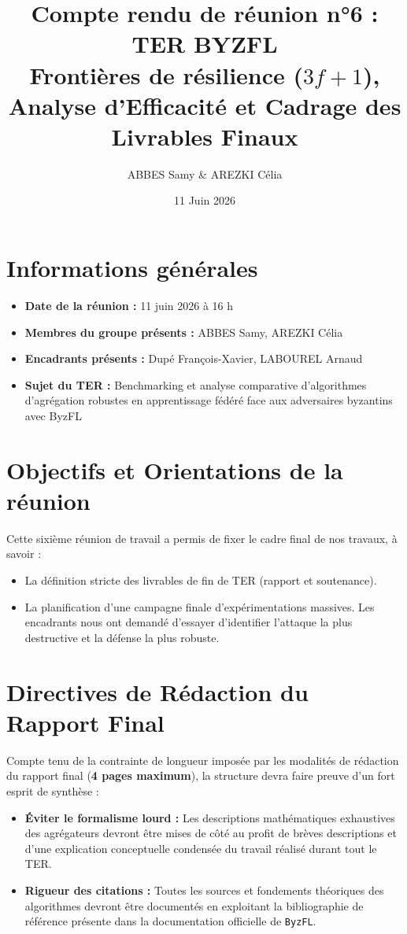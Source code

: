 \documentclass[11pt, a4paper]{article}
\title{\textbf{Compte rendu de réunion n°6 : TER BYZFL} \\ \large Frontières de résilience ($3f+1$), Analyse d'Efficacité et Cadrage des Livrables Finaux}
\author{ABBES Samy \& AREZKI Célia}
\date{11 Juin 2026}
\begin{document}
\maketitle

\section*{Informations générales}
\begin{itemize}
    \item \textbf{Date de la réunion :} 11 juin 2026 à 16 h
    \item \textbf{Membres du groupe présents :} ABBES Samy, AREZKI Célia
    \item \textbf{Encadrants présents :} Dupé François-Xavier, LABOUREL Arnaud
    \item \textbf{Sujet du TER :} Benchmarking et analyse comparative d'algorithmes d'agrégation robustes en apprentissage fédéré face aux adversaires byzantins avec ByzFL
\end{itemize}

\section{Objectifs et Orientations de la réunion}
Cette sixième réunion de travail a permis de fixer le cadre final de nos travaux, à savoir : 
\begin{itemize}
    \item La définition stricte des livrables de fin de TER (rapport et soutenance).
    \item La planification d'une campagne finale d'expérimentations massives. Les encadrants nous ont demandé d'essayer d'identifier l'attaque la plus destructive et la défense la plus robuste.
\end{itemize}

\section{Directives de Rédaction du Rapport Final}
Compte tenu de la contrainte de longueur imposée par les modalités de rédaction du rapport final (\textbf{4 pages maximum}), la structure devra faire preuve d'un fort esprit de synthèse :
\begin{itemize}
    \item \textbf{Éviter le formalisme lourd :} Les descriptions mathématiques exhaustives des agrégateurs devront être mises de côté au profit de brèves descriptions et d'une explication conceptuelle condensée du travail réalisé durant tout le TER.
    \item \textbf{Rigueur des citations :} Toutes les sources et fondements théoriques des algorithmes devront être documentés en exploitant la bibliographie de référence présente dans la documentation officielle de \texttt{ByzFL}.
\end{itemize}
\end{document}
